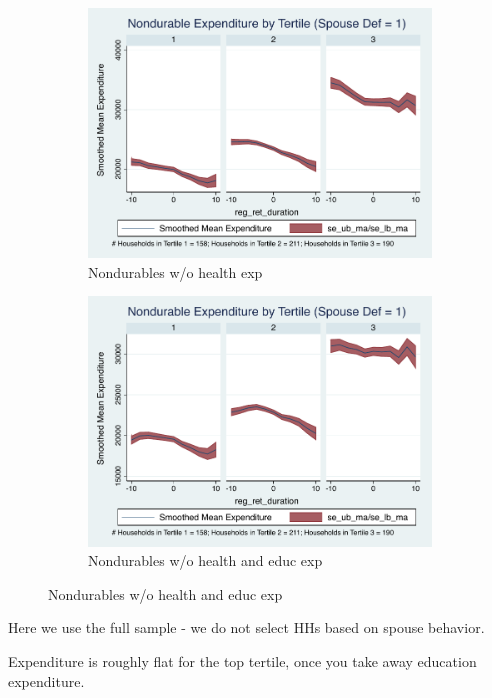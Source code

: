\documentclass[a4paper]{article}
\begin{document}
\begin{figure}[h]
	\begin{subfigure}{0.5\textwidth}
		\centering
		\includegraphics[width=0.9\linewidth]{../ConsumptionPostRetirement_by_SpouseDef/Smoothed_xhealth/spouse_def_1.pdf}
		\caption{Nondurables w/o health exp}
		\label{fig:chapter001_dist_001}
	\end{subfigure}
	\hspace{1cm}
	\begin{subfigure}{0.5\textwidth}
		\includegraphics[width=0.9\linewidth]{../ConsumptionPostRetirement_by_SpouseDef/Smoothed_xhealth_educ/spouse_def_1.pdf}
		\caption{Nondurables w/o health and educ exp}
		\label{fig:chapter001_reward_001}
	\end{subfigure}
\end{figure}

Here we use the full sample - we do not select HHs based on spouse behavior.

Expenditure is roughly flat for the top tertile, once you take away education expenditure.
\end{document}
